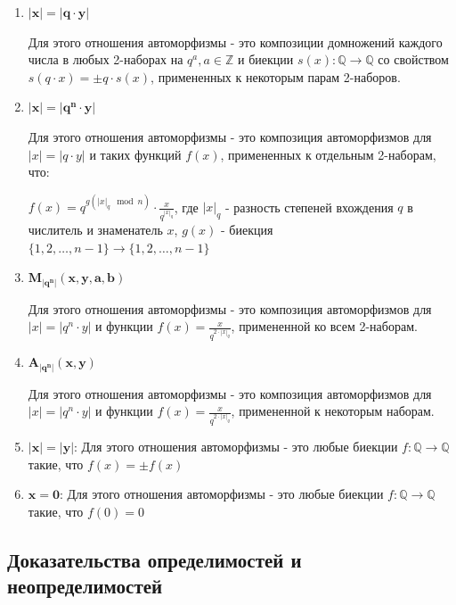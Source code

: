 \documentclass[12pt]{article}
\theoremstyle{definition}
\begin{document}
	   \begin{enumerate}
	    \item $\mathbf{|x| = |q\cdot y|}$
	   
	    Для этого отношения автоморфизмы - это композиции домножений каждого числа в любых 2-наборах на $q^a, a \in \mathbb{Z}$ и биекции $s(x)\colon \mathbb{Q} \longrightarrow \mathbb{Q}$ со свойством $s(q\cdot x) = \pm q \cdot s(x)$, примененных к некоторым парам 2-наборов. 
	   
	   
	    \item $\mathbf{|x| = |q^n\cdot y|}$
	   
	    Для этого отношения автоморфизмы - это композиция автоморфизмов для $|x| = |q\cdot y|$ и таких функций $f(x)$, примененных к отдельным 2-наборам, что:
	   
	    $f(x) = q^{g(|x|_q \mod n)}\cdot \frac{x}{q^{|x|_q}}$, где $|x|_q$ - разность степеней вхождения $q$ в числитель и знаменатель $x$, $g(x)$ - биекция $\{1, 2, \dots, n-1 \} \longrightarrow \{1, 2, \dots , n-1 \}$
	   
	    \item $\mathbf{M_{|q^n|}(x, y, a, b)}$
	   
	    Для этого отношения автоморфизмы - это композиция автоморфизмов для $|x| = |q^n \cdot y|$ и функции $f(x) = \frac{x}{q^{2 \cdot |x|_q}}$, примененной ко всем 2-наборам.
	    
	    \item $\mathbf{A_{|q^n|}(x, y)}$
	   
	    Для этого отношения автоморфизмы - это композиция автоморфизмов для $|x| = |q^n \cdot y|$ и функции $f(x) = \frac{x}{q^{2 \cdot |x|_q}}$, примененной к некоторым наборам.
	    \bigskip
	   
	    \item $\mathbf{|x| = |y|}$:
	    Для этого отношения автоморфизмы - это любые биекции $f \colon \mathbb{Q} \longrightarrow \mathbb{Q}$ такие, что $f(x) = \pm f(x)$
	
	
	    \item $\mathbf{x=0}$:
	    Для этого отношения автоморфизмы - это любые биекции $f \colon \mathbb{Q} \longrightarrow \mathbb{Q}$ такие, что $f(0) = 0$
	   
	  \end{enumerate}
	\subsection{Доказательства определимостей и неопределимостей}
\end{document}
